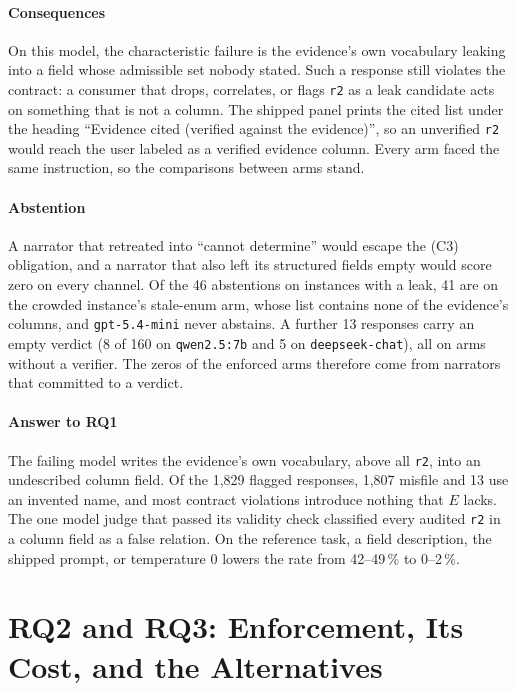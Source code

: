 \documentclass[10pt,twocolumn]{article}
\begin{document}
\paragraph{Consequences}
On this model, the characteristic failure is the evidence's own vocabulary
leaking into a field whose admissible set nobody stated. Such a response still
violates the contract: a consumer that drops, correlates, or flags \texttt{r2}
as a leak candidate acts on something that is not a column. The shipped panel
prints the cited list under the heading ``Evidence cited (verified against the
evidence)'', so an unverified \texttt{r2} would reach the user labeled as
a verified evidence column. Every arm faced the same instruction, so the
comparisons between arms stand.

\paragraph{Abstention}
A narrator that retreated into ``cannot determine'' would escape the (C3)
obligation, and a narrator that also left its structured fields empty would
score zero on every channel. Of the 46 abstentions on instances with a leak,
41 are on the crowded instance's stale-enum arm, whose list contains none of
the evidence's columns, and \texttt{gpt-5.4-mini} never abstains. A further 13
responses carry an empty verdict (8 of 160 on \texttt{qwen2.5:7b} and 5 on
\texttt{deepseek-chat}), all on arms without a verifier. The zeros of the
enforced arms therefore come from narrators that committed to a verdict.

\paragraph{Answer to RQ1}
The failing model writes the evidence's own vocabulary, above all
\texttt{r2}, into an undescribed column field. Of the 1{,}829 flagged
responses, 1{,}807 misfile and 13 use an invented name, and most contract
violations introduce nothing that $E$ lacks. The one model judge that passed its
validity check classified every audited \texttt{r2} in a column field as a
false relation. On the reference task, a field description, the
shipped prompt, or temperature 0 lowers the rate from 42--49\,\% to
0--2\,\%.

\section{RQ2 and RQ3: Enforcement, Its Cost, and the Alternatives}\label{sec:rq3}
\end{document}
